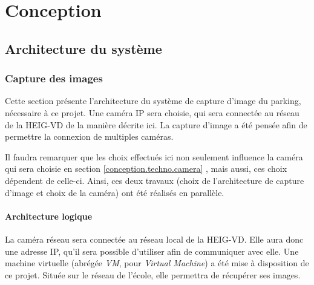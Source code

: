 \chapter{Conception}


\section{Architecture du système}\label{conception.architecture}

\subsection{Capture des images}
Cette section présente l'architecture du système de capture d'image du parking, nécessaire à ce projet. Une caméra IP sera choisie, qui sera connectée au réseau de la HEIG-VD de la manière décrite ici. La capture d'image a été pensée afin de permettre la connexion de multiples caméras.

Il faudra remarquer que les choix effectués ici non seulement influence la caméra qui sera choisie en section \ref{conception.techno.camera} , mais aussi, ces choix dépendent de celle-ci. Ainsi, ces deux travaux (choix de l'architecture de capture d'image et choix de la caméra) ont été réalisés en parallèle.

\subsubsection{Architecture logique}\label{conception.architecture.capture.logique}

 
La caméra réseau sera connectée au réseau local de la HEIG-VD. Elle aura donc une adresse IP, qu'il sera possible d'utiliser afin de communiquer avec elle. Une machine virtuelle (abrégée \textit{VM}, pour \textit{Virtual Machine}) a été mise à disposition de ce projet. Située sur le réseau de l'école, elle permettra de récupérer ses images.

